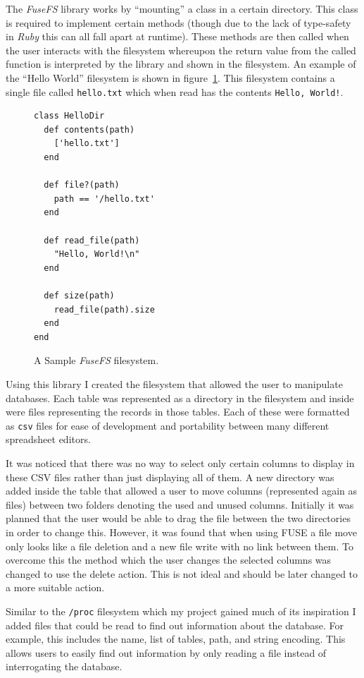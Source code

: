 The \emph{FuseFS} library works by ``mounting'' a class in a certain directory.
This class is required to implement certain methods (though due to the lack of
type-safety in \emph{Ruby} this can all fall apart at runtime). These methods
are then called when the user interacts with the filesystem whereupon the
return value from the called function is interpreted by the library and shown
in the filesystem. An example of the ``Hello World'' filesystem is shown in
figure~\ref{fig:fusefs}. This filesystem contains a single file called
\texttt{hello.txt} which when read has the contents \texttt{Hello, World!}.

\begin{figure}
\begin{verbatim}
class HelloDir
  def contents(path)
    ['hello.txt']
  end

  def file?(path)
    path == '/hello.txt'
  end

  def read_file(path)
    "Hello, World!\n"
  end

  def size(path)
    read_file(path).size
  end
end
\end{verbatim}
  \caption{A Sample \emph{FuseFS} filesystem.}
  \label{fig:fusefs}
\end{figure}

Using this library I created the filesystem that allowed the user to manipulate
databases. Each table was represented as a directory in the filesystem and
inside were files representing the records in those tables. Each of these were
formatted as \texttt{csv} files for ease of development and portability between
many different spreadsheet editors.

It was noticed that there was no way to select only certain columns to display
in these CSV files rather than just displaying all of them. A new directory was
added inside the table that allowed a user to move columns (represented again
as files) between two folders denoting the used and unused columns. Initially
it was planned that the user would be able to drag the file between the two
directories in order to change this. However, it was found that when using
\ac{FUSE} a file move only looks like a file deletion and a new file write with
no link between them. To overcome this the method which the user changes the
selected columns was changed to use the delete action. This is not ideal and
should be later changed to a more suitable action.

Similar to the \texttt{/proc} filesystem which my project gained much of its
inspiration I added files that could be read to find out information about the
database. For example, this includes the name, list of tables, path, and string
encoding. This allows users to easily find out information by only reading
a file instead of interrogating the database.

